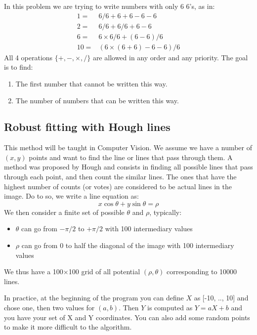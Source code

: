 \documentclass{ecnreport}
\begin{document}
 In this problem we are trying to write numbers with only 6 6's, as in:
 \begin{eqnarray*}
  1 =& 6/6 + 6 +6-6-6 \\
  2 =& 6/6 + 6/6 + 6 - 6 \\
  6 =& 6\times 6/6 + (6-6)/6 \\
  10 =& (6\times(6+6) -6 -6)/6
 \end{eqnarray*}
 All 4 operations $\{+, -, \times, /\}$ are allowed in any order and any priority.
 The goal is to find:
 \begin{enumerate}
  \item The first number that cannot be written this way.
  \item The number of numbers that can be written this way.
 \end{enumerate}
\begin{itemize}
 \end{itemize}
 
 
 \subsection{Robust fitting with Hough lines}
 
 This method will be taught in Computer Vision. We assume we have a number of $(x,y)$ points and want to find the line or lines that pass through them.
 A method was proposed by Hough and consists in finding all possible lines that pass through each point, and then count the similar lines. The ones that have
 the highest number of counts (or votes) are considered to be actual lines in the image.
 Do to so, we write a line equation as:
 \begin{equation*}
  x\cos\theta + y\sin\theta = \rho
 \end{equation*}We then consider a finite set of possible $\theta$ and $\rho$, typically:
 \begin{itemize}
  \item $\theta$ can go from $-\pi/2$ to $+\pi/2$ with 100 intermediary values
  \item $\rho$ can go from 0 to half the diagonal of the image with 100 intermediary values
 \end{itemize}
 We thus have a 100$\times$100 grid of all potential $(\rho,\theta)$ corresponding to 10000 lines.
 
 In practice, at the beginning of the program you can define $X$ as [-10, .., 10] and chose one, then two values for $(a,b)$.
 Then $Y$ is computed as $Y=aX+b$ and you have your set of X and Y coordinates. You can also add some random points to make it more difficult to the algorithm.
 
\end{document}
